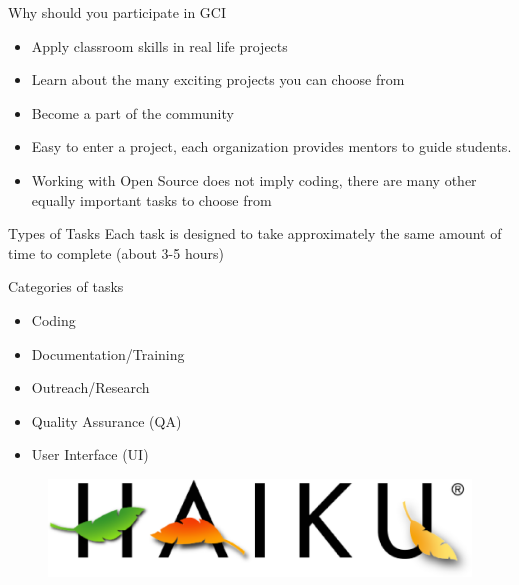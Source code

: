 \documentclass{beamer}
\begin{document}
    \begin{frame}{Why should you participate in GCI}
        \begin{itemize}
            \item Apply classroom skills in real life projects
            \item Learn about the many exciting projects you can choose from
            \item Become a part of the community
            \item Easy to enter a project, each organization provides mentors
                  to guide students.
            \item Working with Open Source does not imply coding, there are
                  many other equally important tasks to choose from
        \end{itemize}
    \end{frame}

    \begin{frame}{Types of Tasks}
        Each task is designed to take approximately the same amount of time to
        complete (about 3-5 hours) 

        \begin{block}{Categories of tasks}
            \begin{itemize}
                \item Coding
                \item Documentation/Training
                \item Outreach/Research
                \item Quality Assurance (QA)
                \item User Interface (UI)
            \end{itemize}
        \end{block}
    \end{frame}

    \begin{frame}{}
        \begin{figure}{}{}
            \includegraphics[scale=0.5]{images/HAIKU_logo_transparent_black.eps}
        \end{figure}
    \end{frame}
\end{document}

